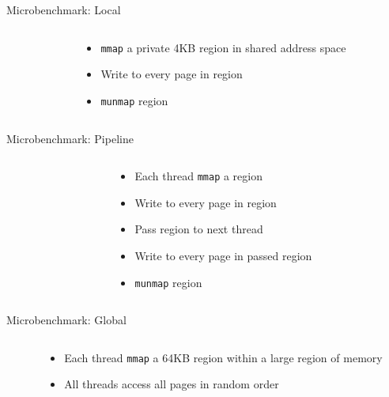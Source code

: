 \documentclass[aspectratio=169]{beamer}
\newcommand{\bi}{\begin{itemize}}
\newcommand{\ei}{\end{itemize}}
\begin{document}
\begin{frame}{Microbenchmark: Local}
  \begin{columns}[T]
    \begin{column}{0.5\textwidth}
      
    \end{column}
    \begin{column}{0.5\textwidth}
      \bi
    \item \texttt{mmap} a private 4KB region in shared address space
    \item Write to every page in region
    \item \texttt{munmap} region
      \ei
    \end{column}
  \end{columns}
\end{frame}

\begin{frame}{Microbenchmark: Pipeline}
  \begin{columns}[T]
    \begin{column}{0.5\textwidth}
      
    \end{column}
    \begin{column}{0.5\textwidth}
      \bi
    \item Each thread \texttt{mmap} a region
    \item Write to every page in region
    \item Pass region to next thread
    \item Write to every page in passed region
    \item \texttt{munmap} region
      \ei
    \end{column}
  \end{columns}
\end{frame}

\begin{frame}{Microbenchmark: Global}
  \begin{columns}[T]
    \begin{column}{0.5\textwidth}
      
    \end{column}
    \begin{column}{0.5\textwidth}
      \bi
    \item Each thread \texttt{mmap} a 64KB region within a large region of memory
    \item All threads access all pages in random order
      \ei
    \end{column}
  \end{columns}
\end{frame}
\end{document}
